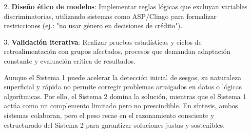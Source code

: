 \documentclass[12pt]{article}
\begin{document}
2. \textbf{Diseño ético de modelos}: Implementar reglas lógicas que excluyan variables discriminatorias, utilizando sistemas como ASP/Clingo para formalizar restricciones (ej.: "no usar género en decisiones de crédito").  

3. \textbf{Validación iterativa}: Realizar pruebas estadísticas y ciclos de retroalimentación con grupos afectados, procesos que demandan adaptación constante y evaluación crítica de resultados.  

Aunque el Sistema 1 puede acelerar la detección inicial de sesgos, su naturaleza superficial y rápida no permite corregir problemas arraigados en datos o lógicas algorítmicas. Por ello, el Sistema 2 domina la solución, mientras que el Sistema 1 actúa como un complemento limitado pero no prescindible. En síntesis, ambos sistemas colaboran, pero el peso recae en el razonamiento consciente y estructurado del Sistema 2 para garantizar soluciones justas y sostenibles.  

\newpage
\end{document}
